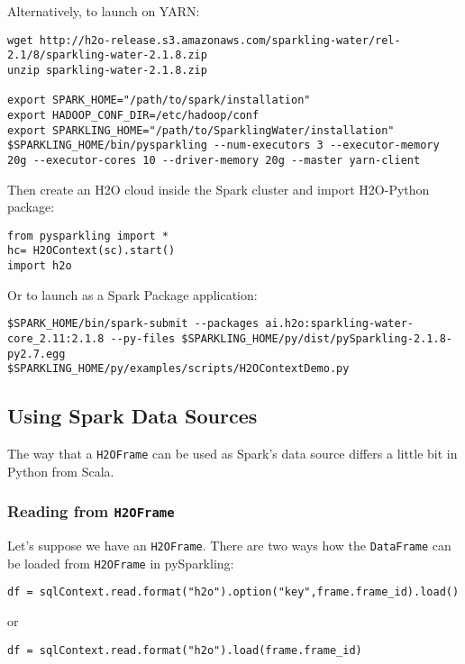 Alternatively, to launch on YARN:

\begin{lstlisting}[style=Bash]
wget http://h2o-release.s3.amazonaws.com/sparkling-water/rel-2.1/8/sparkling-water-2.1.8.zip
unzip sparkling-water-2.1.8.zip
 
export SPARK_HOME="/path/to/spark/installation"
export HADOOP_CONF_DIR=/etc/hadoop/conf
export SPARKLING_HOME="/path/to/SparklingWater/installation"
$SPARKLING_HOME/bin/pysparkling --num-executors 3 --executor-memory 20g --executor-cores 10 --driver-memory 20g --master yarn-client
\end{lstlisting}
    
Then create an H2O cloud inside the Spark cluster and import H2O-Python package:
\begin{lstlisting}[style=Scala]
from pysparkling import *
hc= H2OContext(sc).start()
import h2o
\end{lstlisting}

Or to launch as a Spark Package application:
\begin{lstlisting}[style=Bash]
$SPARK_HOME/bin/spark-submit --packages ai.h2o:sparkling-water-core_2.11:2.1.8 --py-files $SPARKLING_HOME/py/dist/pySparkling-2.1.8-py2.7.egg
$SPARKLING_HOME/py/examples/scripts/H2OContextDemo.py 
\end{lstlisting}


\subsection{Using Spark Data Sources}

The way that a \texttt{H2OFrame} can be used as Spark's data source differs a little bit in Python from Scala.

\subsubsection{Reading from \texttt{H2OFrame}}

Let's suppose we have an \texttt{H2OFrame}. There are two ways how the \texttt{DataFrame} can be loaded from \texttt{H2OFrame} in pySparkling:
\begin{lstlisting}[style=Scala]
df = sqlContext.read.format("h2o").option("key",frame.frame_id).load()
\end{lstlisting}
or
\begin{lstlisting}[style=Scala]
df = sqlContext.read.format("h2o").load(frame.frame_id)
\end{lstlisting}

